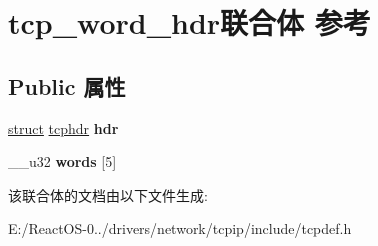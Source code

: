 \hypertarget{uniontcp__word__hdr}{}\section{tcp\+\_\+word\+\_\+hdr联合体 参考}
\label{uniontcp__word__hdr}
\subsection*{Public 属性}
\begin{DoxyCompactItemize}
\item 
\mbox{\label{uniontcp__word__hdr_a8a94ffb957954d7cf40bf18b6c867285}} 
\hyperlink{interfacestruct}{struct} \hyperlink{structtcphdr}{tcphdr} {\bfseries hdr}
\item 
\mbox{\label{uniontcp__word__hdr_a6e3fdc772df29cb4951e129cd024046b}} 
\+\_\+\+\_\+u32 {\bfseries words} \mbox{[}5\mbox{]}
\end{DoxyCompactItemize}


该联合体的文档由以下文件生成\+:\begin{DoxyCompactItemize}
\item 
E\+:/\+React\+O\+S-\/0../drivers/network/tcpip/include/tcpdef.\+h\end{DoxyCompactItemize}

